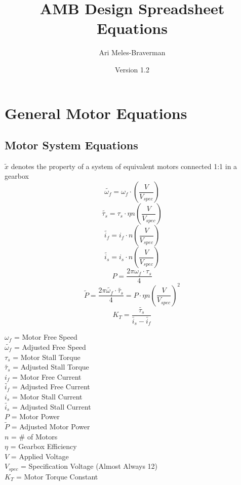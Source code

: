 \documentclass[11pt,a4paper,titlepage]{article}
\begin{document}
	\title{AMB Design Spreadsheet Equations}
	\author{Ari Meles-Braverman}
	\date{Version 1.2}
	\maketitle
	
	\section{General Motor Equations}
	\subsection{Motor System Equations}
	$\tilde{x}$ denotes the property of a system of equivalent motors connected 1:1 in a gearbox
	\begin{equation}
		\tilde{\omega_f} = \omega_f \cdot \left( \frac{V}{V_{spec}} \right)
	\end{equation}
	\begin{equation}
		\tilde{\tau_s} = \tau_s \cdot \eta n \left( \frac{V}{V_{spec}} \right)
	\end{equation}
	\begin{equation}
		\tilde{i_f} = i_f \cdot n \left( \frac{V}{V_{spec}} \right)
	\end{equation}
	\begin{equation}
		\tilde{i_s} = i_s \cdot n \left( \frac{V}{V_{spec}} \right)
	\end{equation}
	\begin{equation}
		P = \frac{2\pi \omega_f \cdot \tau_s}{4}
	\end{equation}
	\begin{equation}
		\tilde{P} = \frac{2\pi \tilde{\omega_f} \cdot \tilde{\tau_s}}{4} = P \cdot \eta n \left( \frac{V}{V_{spec}} \right) ^2
	\end{equation}
	\begin{equation}
		K_T = \frac{\tilde{\tau_s}}{\tilde{i_s} - \tilde{i_f}}
	\end{equation}
	
	$\omega_f$ = Motor Free Speed \\
	$\tilde{\omega_f}$ = Adjusted Free Speed \\
	$\tau_s$ = Motor Stall Torque \\
	$\tilde{\tau_s}$ = Adjusted Stall Torque \\
	$i_f$ = Motor Free Current \\
	$\tilde{i_f}$ = Adjusted Free Current \\
	$i_s$ = Motor Stall Current \\
	$\tilde{i_s}$ = Adjusted Stall Current \\
	$P$ = Motor Power \\
	$\tilde{P}$ = Adjusted Motor Power \\
	$n$ = \# of Motors \\
	$\eta$ = Gearbox Efficiency \\
	$V$ = Applied Voltage \\
	$V_{spec}$ = Specification Voltage (Almost Always 12) \\
	$K_T$ = Motor Torque Constant
	
\end{document}

